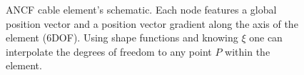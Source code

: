 \begin{figure}
\centering
{}
		\caption{ANCF cable element's schematic. Each node features a global position vector and a position vector gradient along the axis of the element (6DOF). Using shape functions and knowing $\xi$ one can interpolate the degrees of freedom to any point $P$ within the element. } \label{fig:ANCFCable}
\end{figure}
